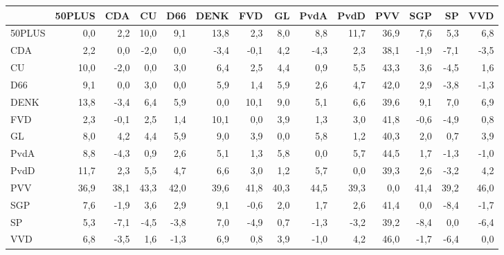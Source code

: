 \begin{tabular}{lrrrrrrrrrrrrr}
\toprule
{} &  50PLUS &   CDA &    CU &   D66 &  DENK &   FVD &    GL &  PvdA &  PvdD &   PVV &   SGP &    SP &   VVD \\
\midrule
50PLUS &     0,0 &   2,2 &  10,0 &   9,1 &  13,8 &   2,3 &   8,0 &   8,8 &  11,7 &  36,9 &   7,6 &   5,3 &   6,8 \\
CDA    &     2,2 &   0,0 &  -2,0 &   0,0 &  -3,4 &  -0,1 &   4,2 &  -4,3 &   2,3 &  38,1 &  -1,9 &  -7,1 &  -3,5 \\
CU     &    10,0 &  -2,0 &   0,0 &   3,0 &   6,4 &   2,5 &   4,4 &   0,9 &   5,5 &  43,3 &   3,6 &  -4,5 &   1,6 \\
D66    &     9,1 &   0,0 &   3,0 &   0,0 &   5,9 &   1,4 &   5,9 &   2,6 &   4,7 &  42,0 &   2,9 &  -3,8 &  -1,3 \\
DENK   &    13,8 &  -3,4 &   6,4 &   5,9 &   0,0 &  10,1 &   9,0 &   5,1 &   6,6 &  39,6 &   9,1 &   7,0 &   6,9 \\
FVD    &     2,3 &  -0,1 &   2,5 &   1,4 &  10,1 &   0,0 &   3,9 &   1,3 &   3,0 &  41,8 &  -0,6 &  -4,9 &   0,8 \\
GL     &     8,0 &   4,2 &   4,4 &   5,9 &   9,0 &   3,9 &   0,0 &   5,8 &   1,2 &  40,3 &   2,0 &   0,7 &   3,9 \\
PvdA   &     8,8 &  -4,3 &   0,9 &   2,6 &   5,1 &   1,3 &   5,8 &   0,0 &   5,7 &  44,5 &   1,7 &  -1,3 &  -1,0 \\
PvdD   &    11,7 &   2,3 &   5,5 &   4,7 &   6,6 &   3,0 &   1,2 &   5,7 &   0,0 &  39,3 &   2,6 &  -3,2 &   4,2 \\
PVV    &    36,9 &  38,1 &  43,3 &  42,0 &  39,6 &  41,8 &  40,3 &  44,5 &  39,3 &   0,0 &  41,4 &  39,2 &  46,0 \\
SGP    &     7,6 &  -1,9 &   3,6 &   2,9 &   9,1 &  -0,6 &   2,0 &   1,7 &   2,6 &  41,4 &   0,0 &  -8,4 &  -1,7 \\
SP     &     5,3 &  -7,1 &  -4,5 &  -3,8 &   7,0 &  -4,9 &   0,7 &  -1,3 &  -3,2 &  39,2 &  -8,4 &   0,0 &  -6,4 \\
VVD    &     6,8 &  -3,5 &   1,6 &  -1,3 &   6,9 &   0,8 &   3,9 &  -1,0 &   4,2 &  46,0 &  -1,7 &  -6,4 &   0,0 \\
\bottomrule
\end{tabular}
